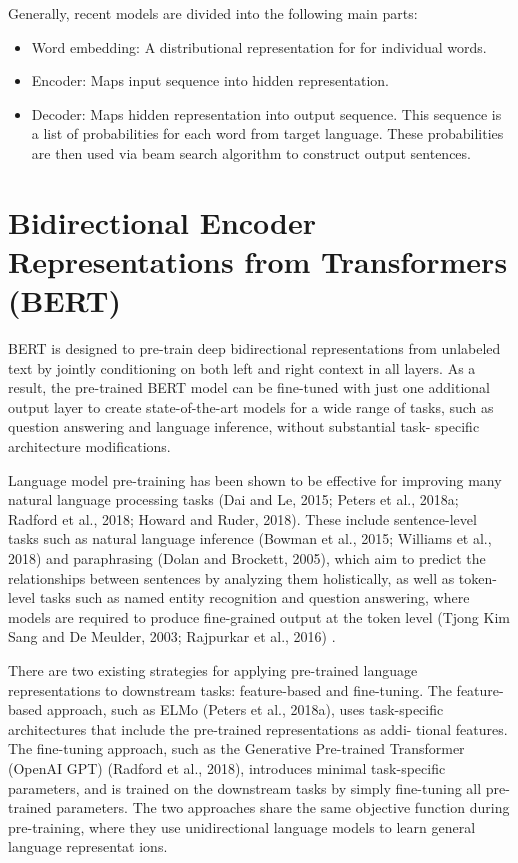 \documentclass{report}
\begin{document}
Generally, recent models are divided into the following main parts:
\begin{itemize}
	\item Word embedding: A distributional representation for for individual words.
	\item Encoder: Maps input sequence into hidden representation.
	\item Decoder: Maps hidden representation into output sequence. This sequence is a list of probabilities for each word from target language. These probabilities are then used via beam search algorithm to construct output sentences.
\end{itemize}
\section{Bidirectional Encoder Representations from Transformers (BERT)}
\label{sec:bert}
BERT is designed to pre-train deep bidirectional representations from unlabeled text by jointly conditioning on both left and right context in all layers. As a result, the pre-trained BERT model can be fine-tuned with just one additional output layer to create state-of-the-art models for a wide range of tasks, such as question answering and language inference, without substantial task- specific architecture modifications.

Language model pre-training has been shown to be effective for improving many natural language processing tasks (Dai and Le, 2015; Peters et al., 2018a; Radford et al., 2018; Howard and Ruder, 2018). These include sentence-level tasks such as natural language inference (Bowman et al., 2015; Williams et al., 2018) and paraphrasing (Dolan and Brockett, 2005), which aim to predict the relationships between sentences by analyzing them holistically, as well as token-level tasks such as named entity recognition and question answering, where models are required to produce fine-grained output at the token level (Tjong Kim Sang and De Meulder, 2003; Rajpurkar et al., 2016) .

There are two existing strategies for applying pre-trained language representations to downstream tasks: feature-based and fine-tuning. The feature-based approach, such as ELMo (Peters et al., 2018a), uses task-specific architectures that include the pre-trained representations as addi- tional features. The fine-tuning approach, such as the Generative Pre-trained Transformer (OpenAI GPT) (Radford et al., 2018), introduces minimal task-specific parameters, and is trained on the downstream tasks by simply fine-tuning all pre-trained parameters. The two approaches share the same objective function during pre-training, where they use unidirectional language models to learn general language representat ions.
\end{document}
